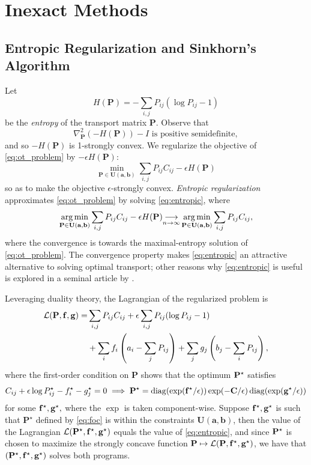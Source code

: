 \documentclass{article}
\renewcommand{\b}{\mathbf}
\theoremstyle{definition}
\theoremstyle{remark}
\newcommand{\feasible}{\b U(\b a, \b b)}
\begin{document}

\section{Inexact Methods} %
\label{sec:inexact_methods}

\subsection{Entropic Regularization and Sinkhorn's Algorithm} %
\label{sub:entropic_regularization_and_sinkhorn_s_algorithm}

Let \[H(\b P)= -\sum_{i,j} P_{ij}(\log P_{ij} - 1)\] be the \emph{entropy} of
 the transport matrix $\b P$. Observe that \[
\nabla^2_{\b P} (-H(\b P)) - I \text{ is positive semidefinite},
\]
and so $-H(\b P)$ is 1-strongly convex. We regularize the objective of 
\eqref{eq:ot_problem} by $-\epsilon H(\b P):$ \begin{equation}
\label{eq:entropic}
  \min_{\b P \in \feasible} \sum_{i,j}P_{ij}C_{ij} - \epsilon H(\b P) 
\tag{Entropic Regularization}
\end{equation}
so as to make the objective $\epsilon$-strongly convex. \emph{Entropic
 regularization} approximates \eqref{eq:ot_problem} by solving 
\eqref{eq:entropic}, where \[
\argmin_{\b P \in \feasible} \sum_{i,j}P_{ij}C_{ij} - \epsilon H(\b P) 
 {\underset{n\to\infty}{\longrightarrow}}
 \argmin_{\b P \in \feasible} \sum_{i,j}P_{ij}C_{ij},
\]
where the convergence is towards the maximal-entropy solution of 
\eqref{eq:ot_problem}. The convergence property makes \eqref{eq:entropic} an
 attractive alternative to solving optimal transport; other reasons why 
\eqref{eq:entropic} is useful is explored in a seminal article by 
\cite{cuturi2013sinkhorn}. 

Leveraging duality theory, the Lagrangian of the regularized problem is 
\begin{align*}
\mathcal L(\b P, \b f, \b g) = & \sum_{i,j} P_{ij}C_{ij} + \epsilon \sum_
{i,j} P_{ij}
(\log
 P_{ij} - 1) \\ 
& + \sum_i f_i\pr{a_i - \sum_{j}P_{ij}} + \sum_j g_j \pr{b_j - \sum_i P_{ij}},
\end{align*}
where the first-order condition on $\b P$ shows that the optimum $\b P^\*$
 satisfies 
\begin{equation}
\label{eq:foc}
  C_{ij} + \epsilon \log P_{ij}^\* - f_i^\star - g_j^\* = 0 \implies \b P^\* =
 \diag(\exp(\b f^\* / \epsilon)) \exp(-\b C/\epsilon )\diag(\exp(\b g^\* /
 \epsilon))
\end{equation}
for some $\b f^\star, \b g^\*,$ where the $\exp$ is taken component-wise.
 Suppose $\b f^\star, \b g^\*$ is such that $\b P^\star$ defined by 
\eqref{eq:foc} is within the constraints $\feasible$, then the value of the
 Lagrangian $\mathcal L(\b P^\*, \b f^\*, \b g^\*)$ equals the value of 
\eqref{eq:entropic}, and since  $\b P^\*$ is chosen to maximize the strongly
 concave function $\b P \mapsto \mathcal L(\b P, \b f^\*, \b g^\*)$, we have
 that $(\b P^\*, \b f^\*, \b g^\*)$ solves both programs. 
\end{document}
